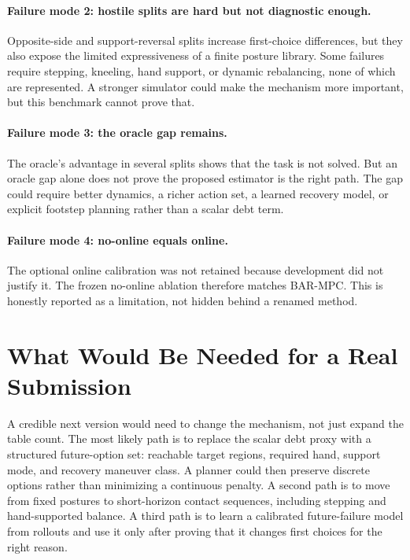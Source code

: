 \documentclass{article}
\newcommand{\method}{\textsc{BAR-MPC}}
\begin{document}
\paragraph{Failure mode 2: hostile splits are hard but not diagnostic enough.}
Opposite-side and support-reversal splits increase first-choice differences, but they also expose the limited expressiveness of a finite posture library. Some failures require stepping, kneeling, hand support, or dynamic rebalancing, none of which are represented. A stronger simulator could make the mechanism more important, but this benchmark cannot prove that.

\paragraph{Failure mode 3: the oracle gap remains.}
The oracle's advantage in several splits shows that the task is not solved. But an oracle gap alone does not prove the proposed estimator is the right path. The gap could require better dynamics, a richer action set, a learned recovery model, or explicit footstep planning rather than a scalar debt term.

\paragraph{Failure mode 4: no-online equals online.}
The optional online calibration was not retained because development did not justify it. The frozen no-online ablation therefore matches \method{}. This is honestly reported as a limitation, not hidden behind a renamed method.

\section{What Would Be Needed for a Real Submission}

A credible next version would need to change the mechanism, not just expand the table count. The most likely path is to replace the scalar debt proxy with a structured future-option set: reachable target regions, required hand, support mode, and recovery maneuver class. A planner could then preserve discrete options rather than minimizing a continuous penalty. A second path is to move from fixed postures to short-horizon contact sequences, including stepping and hand-supported balance. A third path is to learn a calibrated future-failure model from rollouts and use it only after proving that it changes first choices for the right reason.
\end{document}

